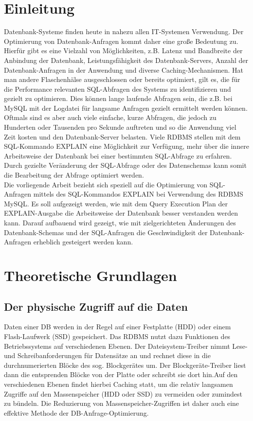 \section{Einleitung}
Datenbank-Systeme finden heute in nahezu allen IT-Systemen Verwendung.
Der Optimierung von Datenbank-Anfragen kommt daher eine große Bedeutung zu.
Hierfür gibt es eine Vielzahl von Möglichkeiten, z.B. Latenz und Bandbreite der Anbindung der Datenbank, Leistungsfähigkeit des Datenbank-Servers, Anzahl der Datenbank-Anfragen in der Anwendung und diverse Caching-Mechanismen.
Hat man andere Flaschenhälse ausgeschlossen oder bereits optimiert, gilt es, die für die Performance relevanten SQL-Abfragen des Systems zu identifizieren und gezielt zu optimieren. Dies können lange laufende Abfragen sein, die z.B. bei MySQL mit der Logdatei für langsame Anfragen gezielt ermittelt werden können. Oftmals sind es aber auch viele einfache, kurze Abfragen, die jedoch zu Hunderten oder Tausenden pro Sekunde auftreten und so die Anwendung viel Zeit kosten und den Datenbank-Server belasten.
Viele RDBMS stellen mit dem SQL-Kommando EXPLAIN eine Möglichkeit zur Verfügung, mehr über die innere Arbeitsweise der Datenbank bei einer bestimmten SQL-Abfrage zu erfahren. Durch gezielte Veränderung der SQL-Abfrage oder des Datenschemas kann somit die Bearbeitung der Abfrage optimiert werden.
\\Die vorliegende Arbeit bezieht sich speziell auf die Optimierung von SQL-Anfragen mittels des SQL-Kommandos EXPLAIN bei Verwendung des RDBMS MySQL.
Es soll aufgezeigt werden, wie mit dem Query Execution Plan der EXPLAIN-Ausgabe die Arbeitsweise der Datenbank besser verstanden werden kann. Darauf aufbauend wird gezeigt, wie mit zielgerichteten Änderungen des Datenbank-Schemas und der SQL-Anfragen die Geschwindigkeit der Datenbank-Anfragen erheblich gesteigert werden kann.

\section{Theoretische Grundlagen}
\subsection{Der physische Zugriff auf die Daten}
Daten einer DB werden in der Regel auf einer Festplatte (HDD) oder einem Flash-Laufwerk (SSD) gespeichert.
Das RDBMS nutzt dazu Funktionen des Betriebssystems auf verschiedenen Ebenen.
Der Dateisystem-Treiber nimmt Lese- und Schreibanforderungen für Datensätze an und rechnet diese in die durchnumerierten Blöcke des sog. Blockgerätes um. Der Blockgeräte-Treiber liest dann die entsprenden Blöcke von der Platte oder schreibt sie dort hin.Auf den verschiedenen Ebenen findet hierbei Caching statt, um die relativ langsamen Zugriffe auf den Massenspeicher (HDD oder SSD) zu vermeiden oder zumindest zu bündeln. Die Reduzierung von Massenspeicher-Zugriffen ist  daher auch eine effektive Methode der DB-Anfrage-Optimierung.

